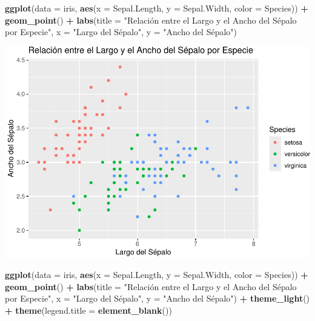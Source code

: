 \documentclass[
]{book}
\newenvironment{Shaded}{\begin{snugshade}}{\end{snugshade}}
\newcommand{\AttributeTok}[1]{\textcolor[rgb]{0.13,0.29,0.53}{#1}}
\newcommand{\FunctionTok}[1]{\textcolor[rgb]{0.13,0.29,0.53}{\textbf{#1}}}
\newcommand{\NormalTok}[1]{#1}
\newcommand{\SpecialCharTok}[1]{\textcolor[rgb]{0.81,0.36,0.00}{\textbf{#1}}}
\newcommand{\StringTok}[1]{\textcolor[rgb]{0.31,0.60,0.02}{#1}}
\begin{document}
\begin{Shaded}
\begin{Highlighting}[]
\FunctionTok{ggplot}\NormalTok{(}\AttributeTok{data =}\NormalTok{ iris, }\FunctionTok{aes}\NormalTok{(}\AttributeTok{x =}\NormalTok{ Sepal.Length, }\AttributeTok{y =}\NormalTok{ Sepal.Width, }\AttributeTok{color =}\NormalTok{ Species)) }\SpecialCharTok{+} 
  \FunctionTok{geom\_point}\NormalTok{() }\SpecialCharTok{+}
  \FunctionTok{labs}\NormalTok{(}\AttributeTok{title =} \StringTok{"Relación entre el Largo y el Ancho del Sépalo por Especie"}\NormalTok{,}
       \AttributeTok{x =} \StringTok{"Largo del Sépalo"}\NormalTok{,}
       \AttributeTok{y =} \StringTok{"Ancho del Sépalo"}\NormalTok{)}
\end{Highlighting}
\end{Shaded}

\includegraphics{bookdown-demo_files/figure-latex/unnamed-chunk-195-1.pdf}

\begin{Shaded}
\begin{Highlighting}[]
\FunctionTok{ggplot}\NormalTok{(}\AttributeTok{data =}\NormalTok{ iris, }\FunctionTok{aes}\NormalTok{(}\AttributeTok{x =}\NormalTok{ Sepal.Length, }\AttributeTok{y =}\NormalTok{ Sepal.Width, }\AttributeTok{color =}\NormalTok{ Species)) }\SpecialCharTok{+} 
  \FunctionTok{geom\_point}\NormalTok{() }\SpecialCharTok{+}
  \FunctionTok{labs}\NormalTok{(}\AttributeTok{title =} \StringTok{"Relación entre el Largo y el Ancho del Sépalo por Especie"}\NormalTok{,}
       \AttributeTok{x =} \StringTok{"Largo del Sépalo"}\NormalTok{,}
       \AttributeTok{y =} \StringTok{"Ancho del Sépalo"}\NormalTok{) }\SpecialCharTok{+}
  \FunctionTok{theme\_light}\NormalTok{() }\SpecialCharTok{+}
  \FunctionTok{theme}\NormalTok{(}\AttributeTok{legend.title =} \FunctionTok{element\_blank}\NormalTok{())}
\end{Highlighting}
\end{Shaded}
\end{document}
